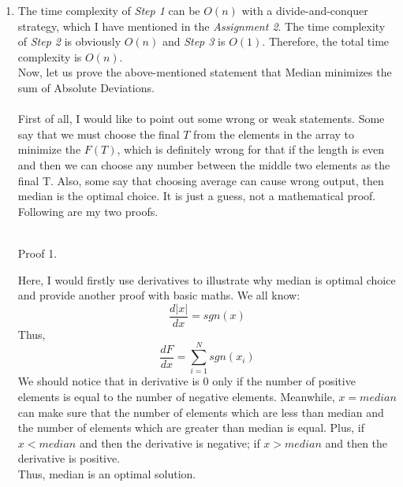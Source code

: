 \documentclass[12pt,a4paper]{article}
\makeatletter
\newtheorem*{solution}{Solution}
\renewenvironment{solution}[1][Solution] {\par\pushQED{\qed}\normalfont\topsep6\p@\@plus6\p@\relax\trivlist\item[\hskip\labelsep\bfseries#1\@addpunct{.}]\ignorespaces}{\popQED\endtrivlist\@endpefalse} \makeatother
\makeatother
\begin{document}
\begin{enumerate}
\begin{solution}
The time complexity of \emph{Step 1} can be $O(n)$ with a divide-and-conquer strategy, which I have mentioned in the \emph{Assignment 2}. The time complexity of \emph{Step 2} is obviously $O(n)$ and \emph{Step 3} is $O(1)$. Therefore, the total time complexity is $O(n)$.\\
Now, let us prove the above-mentioned statement that Median minimizes the sum of Absolute Deviations.\\
\\
First of all, I would like to point out some wrong or weak statements. Some say that we must choose the final $T$ from the elements in the array to minimize the $F(T)$, which is definitely wrong for that if the length is even and then we can choose any number between the middle two elements as the final T. Also, some say that choosing average can cause wrong output, then median is the optimal choice. It is just a guess, not a mathematical proof. \\

Following are my two proofs.
\pagebreak
\\\\

\begin{bf}Proof 1.\end{bf} Here, I would firstly use derivatives to illustrate why median is optimal choice and provide another proof with basic maths.
We all know:
\begin{equation*}
	\frac{d|x|}{dx}=sgn(x)
\end{equation*}
Thus,
\begin{equation*}
	\frac{dF}{dx}=\sum_{i=1}^{N} sgn(x_i)
\end{equation*}
We should notice that in derivative is $0$ only if the number of positive elements is equal to the number of negative elements. Meanwhile, $x=median$ can make sure that the number of elements which are less than median and the number of elements which are greater than median is equal. Plus, if $x<median$ and then the derivative is negative; if $x>median$ and then the derivative is positive.\\Thus, median is an optimal solution.\\


\end{solution}
\end{enumerate}
\end{document}

